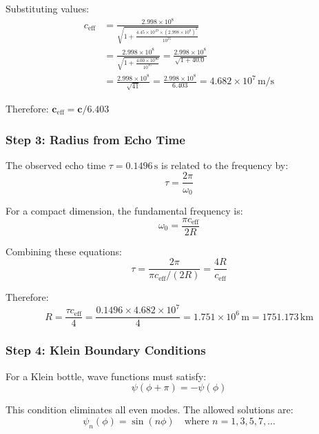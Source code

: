 \documentclass[12pt,a4paper]{article}
\begin{document}
Substituting values:
\begin{align}
c_\mathrm{eff} &= \frac{2.998 \times 10^8}{\sqrt{1 + \frac{4.45 \times 10^{19} \times (2.998 \times 10^8)^2}{10^{35}}}} \\
&= \frac{2.998 \times 10^8}{\sqrt{1 + \frac{4.00 \times 10^{36}}{10^{35}}}} = \frac{2.998 \times 10^8}{\sqrt{1 + 40.0}} \\
&= \frac{2.998 \times 10^8}{\sqrt{41}} = \frac{2.998 \times 10^8}{6.403} = 4.682 \times 10^7\,\mathrm{m/s}
\end{align}

Therefore: $\mathbf{c_\mathrm{eff} = c/6.403}$

\subsubsection{Step 3: Radius from Echo Time}

The observed echo time $\tau = 0.1496\,\mathrm{s}$ is related to the frequency by:
\begin{equation}
\tau = \frac{2\pi}{\omega_0}
\end{equation}

For a compact dimension, the fundamental frequency is:
\begin{equation}
\omega_0 = \frac{\pi c_\mathrm{eff}}{2R}
\end{equation}

Combining these equations:
\begin{equation}
\tau = \frac{2\pi}{\pi c_\mathrm{eff}/(2R)} = \frac{4R}{c_\mathrm{eff}}
\end{equation}

Therefore:
\begin{equation}
R = \frac{\tau c_\mathrm{eff}}{4} = \frac{0.1496 \times 4.682 \times 10^7}{4} = 1.751 \times 10^6\,\mathrm{m} = 1751.173\,\mathrm{km}
\end{equation}

\subsubsection{Step 4: Klein Boundary Conditions}

For a Klein bottle, wave functions must satisfy:
\begin{equation}
\psi(\phi + \pi) = -\psi(\phi)
\end{equation}

This condition eliminates all even modes. The allowed solutions are:
\begin{equation}
\psi_n(\phi) = \sin(n\phi) \quad \text{where } n = 1, 3, 5, 7, \ldots
\end{equation}
\end{document}
